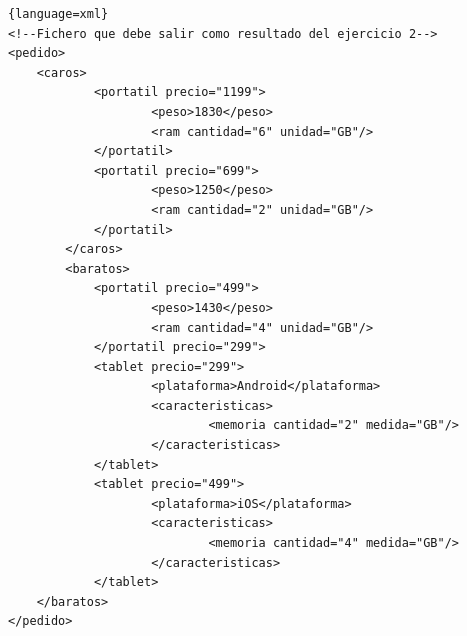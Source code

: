 \documentclass{examen}
\begin{document}
\break

\begin{lstlisting}{language=xml}
<!--Fichero que debe salir como resultado del ejercicio 2-->
<pedido>
	<caros>        
            <portatil precio="1199">
                    <peso>1830</peso>
                    <ram cantidad="6" unidad="GB"/>
            </portatil>
            <portatil precio="699">
                    <peso>1250</peso>
                    <ram cantidad="2" unidad="GB"/>
            </portatil>
        </caros>
        <baratos>
            <portatil precio="499">
                    <peso>1430</peso>
                    <ram cantidad="4" unidad="GB"/>
            </portatil precio="299">
            <tablet precio="299">
                    <plataforma>Android</plataforma>
                    <caracteristicas>
                            <memoria cantidad="2" medida="GB"/>
                    </caracteristicas>
            </tablet>
            <tablet precio="499">
                    <plataforma>iOS</plataforma>
                    <caracteristicas>
                            <memoria cantidad="4" medida="GB"/>
                    </caracteristicas>
            </tablet>
    </baratos>
</pedido>

\end{lstlisting}
\end{document}
